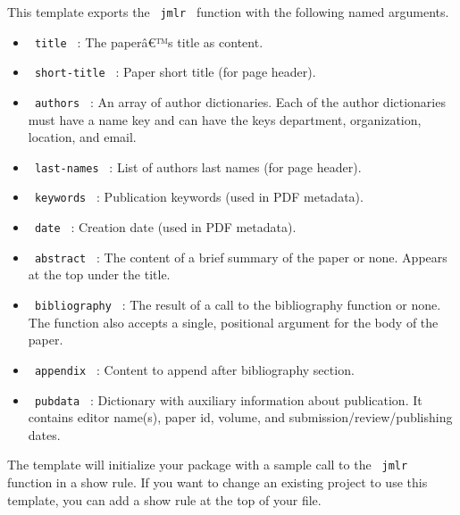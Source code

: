 This template exports the \texttt{\ jmlr\ } function with the following
named arguments.

\begin{itemize}
\tightlist
\item
  \texttt{\ title\ } : The paperâ€™s title as content.
\item
  \texttt{\ short-title\ } : Paper short title (for page header).
\item
  \texttt{\ authors\ } : An array of author dictionaries. Each of the
  author dictionaries must have a name key and can have the keys
  department, organization, location, and email.
\item
  \texttt{\ last-names\ } : List of authors last names (for page
  header).
\item
  \texttt{\ keywords\ } : Publication keywords (used in PDF metadata).
\item
  \texttt{\ date\ } : Creation date (used in PDF metadata).
\item
  \texttt{\ abstract\ } : The content of a brief summary of the paper or
  none. Appears at the top under the title.
\item
  \texttt{\ bibliography\ } : The result of a call to the bibliography
  function or none. The function also accepts a single, positional
  argument for the body of the paper.
\item
  \texttt{\ appendix\ } : Content to append after bibliography section.
\item
  \texttt{\ pubdata\ } : Dictionary with auxiliary information about
  publication. It contains editor name(s), paper id, volume, and
  submission/review/publishing dates.
\end{itemize}

The template will initialize your package with a sample call to the
\texttt{\ jmlr\ } function in a show rule. If you want to change an
existing project to use this template, you can add a show rule at the
top of your file.

\begin{Shaded}
\begin{Highlighting}[]
\NormalTok{  ),}
\NormalTok{)}
\end{Highlighting}
\end{Shaded}

